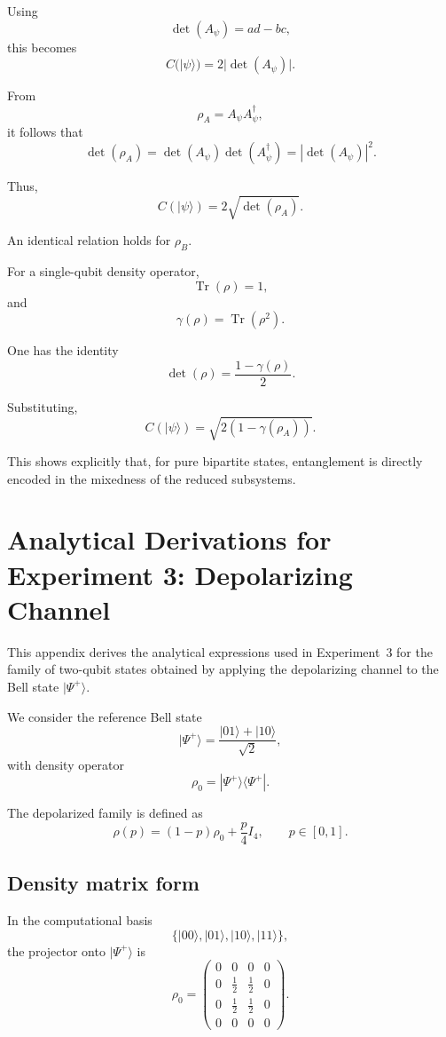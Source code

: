 \documentclass[a4paper]{article}
\begin{document}
Using
\[
\det(A_\psi) = ad - bc,
\]
this becomes
\[
C(|\psi\rangle)=2|\det(A_\psi)|.
\]

From
\[
\rho_A = A_\psi A_\psi^\dagger,
\]
it follows that
\[
\det(\rho_A)
=
\det(A_\psi)\det(A_\psi^\dagger)
=
|\det(A_\psi)|^2.
\]

Thus,
\[
C(|\psi\rangle)=2\sqrt{\det(\rho_A)}.
\]

An identical relation holds for \(\rho_B\).

For a single-qubit density operator,
\[
\operatorname{Tr}(\rho)=1,
\]
and
\[
\gamma(\rho)=\operatorname{Tr}(\rho^2).
\]

One has the identity
\[
\det(\rho)
=
\frac{1 - \gamma(\rho)}{2}.
\]

Substituting,
\[
C(|\psi\rangle)
=
\sqrt{2\left(1 - \gamma(\rho_A)\right)}.
\]

This shows explicitly that, for pure bipartite states, entanglement is directly encoded in the mixedness of the reduced subsystems.


\section{Analytical Derivations for Experiment 3: Depolarizing Channel}

This appendix derives the analytical expressions used in Experiment~3 for the family of two-qubit states obtained by applying the depolarizing channel to the Bell state \( |\Psi^+\rangle \).

We consider the reference Bell state
\[
|\Psi^+\rangle = \frac{|01\rangle + |10\rangle}{\sqrt{2}},
\]
with density operator
\[
\rho_0 = |\Psi^+\rangle\langle\Psi^+|.
\]

The depolarized family is defined as
\[
\rho(p)
=
(1-p)\rho_0 + \frac{p}{4}I_4,
\qquad
p \in [0,1].
\]


\subsection*{Density matrix form}

In the computational basis
\[
\{|00\rangle, |01\rangle, |10\rangle, |11\rangle\},
\]
the projector onto \( |\Psi^+\rangle \) is
\[
\rho_0
=
\begin{pmatrix}
0 & 0 & 0 & 0\\
0 & \frac12 & \frac12 & 0\\
0 & \frac12 & \frac12 & 0\\
0 & 0 & 0 & 0
\end{pmatrix}.
\]
\end{document}
